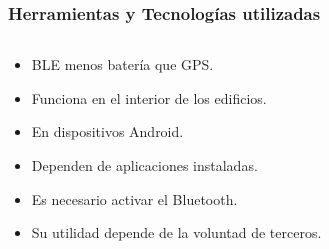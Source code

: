 \begin{frame}
	\frametitle{Herramientas y Tecnologías utilizadas}
		\begin{columns}
			\begin{column}{0.9\textwidth}
					\begin{itemize}
						\item {BLE menos batería que GPS.}
						\item {Funciona en el interior de los edificios.}
						\item {En dispositivos Android.}
					\end{itemize}
				\endblock{}			
					\begin{itemize}
						\item {Dependen de aplicaciones instaladas.}
						\item {Es necesario activar el Bluetooth.}
						\item {Su utilidad depende de la voluntad de terceros.}
					\end{itemize}
				\endblock{}
			\end{column}
		\end{columns}
	\endblock{}
\end{frame}


